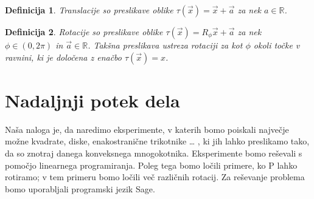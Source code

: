 \documentclass[a4paper, 12pt]{article}
\newtheorem{definicija}{Definicija}
\begin{document}
\begin{definicija}
    Translacije so preslikave oblike $\tau(\vec{x}) = \vec{x} + \vec{a}$ za nek $a \in \mathbb{R}$.
\end{definicija}

\begin{definicija}
    Rotacije so preslikave oblike $\tau (\vec{x}) = R_{\phi}\vec{x} + \vec{a}$ za nek $\phi \in (0, 2\pi)$ in $\vec{a} \in \mathbb{R}$. 
    Takšna preslikava ustreza rotaciji za kot $\phi$ okoli točke v ravnini, ki je določena z enačbo $\tau (\vec{x}) = x$. 
\end{definicija}


\section{Nadaljnji potek dela}

Naša naloga je, da naredimo eksperimente, v katerih bomo
 poiskali največje možne kvadrate, diske, enakostranične trikotnike … ,
  ki jih lahko preslikamo tako, da so znotraj danega konveksnega
   mnogokotnika. Eksperimente bomo reševali s pomočjo linearnega 
   programiranja. Poleg tega bomo ločili primere, ko P lahko rotiramo;
    v tem primeru bomo ločili več različnih rotacij. 
Za reševanje problema bomo uporabljali programski jezik Sage.
\end{document}
